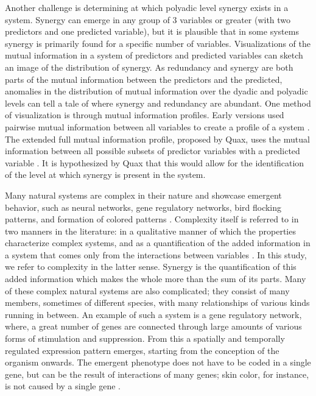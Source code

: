 \documentclass[../main.tex]{subfiles}
\begin{document}
Another challenge is determining at which polyadic level synergy exists in a system.
Synergy can emerge in any group of 3 variables or greater (with two predictors and one predicted variable), but it is plausible that in some systems synergy is primarily found for a specific number of variables.
Visualizations of the mutual information in a system of predictors and predicted variables can sketch an image of the distribution of synergy.
As redundancy and synergy are both parts of the mutual information between the predictors and the predicted, anomalies in the distribution of mutual information over the dyadic and polyadic levels can tell a tale of where synergy and redundancy are abundant.
One method of visualization is through mutual information profiles.
Early versions used pairwise mutual information between all variables to create a profile of a system \cite{bar2013computationally}.
The extended full mutual information profile, proposed by Quax, uses the mutual information between all possible subsets of predictor variables with a predicted variable \cite{QuaxPersonal}.
It is hypothesized by Quax that this would allow for the identification of the level at which synergy is present in the system.

Many natural systems are complex in their nature and showcase emergent behavior, such as neural networks, gene regulatory networks, bird flocking patterns, and formation of colored patterns \cite{choi2001supply, gat1999synergy, kondo2010reaction, liang2008gene}.
Complexity itself is referred to in two manners in the literature: in a qualitative manner of which the properties characterize complex systems, and as a quantification of the added information in a system that comes only from the interactions between variables \cite{bar2004multiscale}.
In this study, we refer to complexity in the latter sense.
Synergy is the quantification of this added information which makes the whole more than the sum of its parts.
Many of these complex natural systems are also complicated; they consist of many members, sometimes of different species, with many relationships of various kinds running in between.
An example of such a system is a gene regulatory network, where, a great number of genes are connected through large amounts of various forms of stimulation and suppression.
From this a spatially and temporally regulated expression pattern emerges, starting from the conception of the organism onwards.
The emergent phenotype does not have to be coded in a single gene, but can be the result of interactions of many genes; skin color, for instance, is not caused by a single gene \cite{barsh2003controls}.
\end{document}
